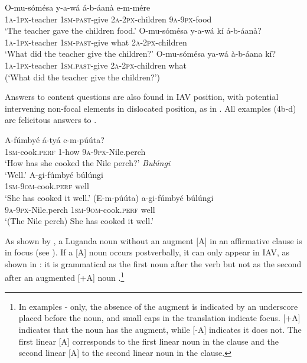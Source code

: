 \documentclass[output=paper]{langsci/langscibook}
\begin{document}
\ea\label{ex:vanderwal:3}
\ea\label{ex:vanderwal:3a}
\gll   O-mu-sómésa  y-a-wá     á-b-áanà    e-m-mére\\
       \textsc{1a-1px}-teacher  \textsc{1sm-past}-give  \textsc{2a-2px}-children  \textsc{9a}-\textsc{9px}-food\\
\glt   ‘The teacher gave the children food.’
\ex\label{ex:vanderwal:3b}
\gll   O-mu-sómésa  y-a-wá    kí  á-b-áanà?\\
       \textsc{1a-1px}-teacher  \textsc{1sm-past}-give  what  \textsc{2a-2px}-children\\
\glt   ‘What did the teacher give the children?’
\ex\label{ex:vanderwal:3c}
\gll  *O-mu-sómésa  ya-wá      à-b-áana    kí?\\
       \textsc{1a-1px}-teacher  \textsc{1sm.past-}give  \textsc{2a-2px}-children  what\\
\glt   (‘What did the teacher give the children?’)
\z
\z

Answers to content questions are also found in IAV position, with potential intervening non-focal elements in dislocated position, as in . All examples (4b-d) are felicitous answers to .

\ea\label{ex:vanderwal:4}
\ea\label{ex:vanderwal:4a}
\gll A-fúmbyé    á-tyá    e-m-púúta?\\
       \textsc{1sm}-cook.\textsc{perf}  1-how    \textsc{9a}-\textsc{9px}-Nile.perch\\
\glt ‘How has she cooked the Nile perch?’
\ex\label{ex:vanderwal:4b}
   \textit{Bulúngi}\\
\glt  ‘Well.’
\ex\label{ex:vanderwal:4c}
\gll  A-gi-fúmbyé      búlúngi\\
       \textsc{1sm}-\textsc{9om}-cook.\textsc{perf}  well\\
\glt   ‘She has cooked it well.’
\ex\label{ex:vanderwal:4d}
\gll  (E-m-púúta)    a-gi-fúmbyé      búlúngi\\
       \textsc{9a}-\textsc{9px}-Nile.perch  \textsc{1sm}-\textsc{9om}-cook.\textsc{perf}  well\\
\glt   ‘(The Nile perch) She has cooked it well.’
\z
\z

As shown by \citet{HymanKatamba1993}, a Luganda noun without an augment [A] in an affirmative clause is in focus (see ). If a [A] noun occurs postverbally, it can only appear in IAV, as shown in : it is grammatical as the first noun after the verb  but not as the second after an augmented [+A] noun .\footnote{In examples - only, the absence of the augment is indicated by an underscore placed before the noun, and small caps in the translation indicate focus. [+A] indicates that the noun has the augment, while [-A] indicates it does not.  The first linear [A] corresponds to the first linear noun in the clause and the second linear [A] to the second linear noun in the clause.} 
\end{document}
